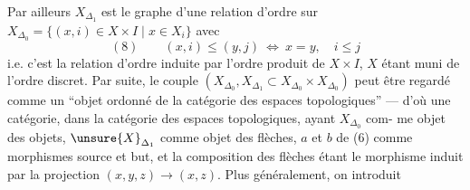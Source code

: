 Par ailleurs $X_{\Delta_1}$ est le graphe d'une relation
d'ordre sur $X_{\Delta_0}=\{(x,i)\in X\times I\mid x\in X_i\}$
avec
\[
(8)\qquad (x,i)\leq(y,j)\ \Longleftrightarrow\ x=y,\quad i\leq j
\]
i.e. c'est la relation d'ordre induite par
l'ordre produit de $X\times I$, $X$ étant muni
de l'ordre discret. Par suite, le
couple $(X_{\Delta_0},X_{\Delta_1}\subset X_{\Delta_0}\times X_{\Delta_0})$ peut
être regardé comme un ``objet ordonné de
la catégorie des espaces topologiques'' ---
d'où une catégorie, dans la catégorie
des espaces topologiques, ayant $X_{\Delta_0}$ com-
me objet des objets, $\unsure{X}_{\Delta_1}$ comme objet
des flèches, $a$ et $b$ de (6) comme
morphismes source et but, et la
composition des flèches étant le
morphisme
induit par la projection $(x,y,z)\longrightarrow(x,z)$.
Plus généralement, on introduit 
